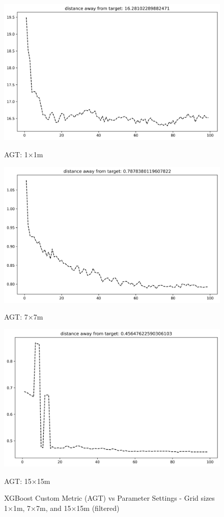 \documentclass[runningheads]{llncs}
\begin{document}
\begin{figure}[H]
	\centering
	\begin{minipage}{0.32\textwidth}
		\centering
		\includegraphics[width=\textwidth]{figures/xgb_softmax_custom_1.png}
		\caption*{AGT: 1×1m}
	\end{minipage}
	\hfill
	\begin{minipage}{0.32\textwidth}
		\centering
		\includegraphics[width=\textwidth]{figures/xgb_softmax_custom_7.png}
		\caption*{AGT: 7×7m}
	\end{minipage}
	\hfill
	\begin{minipage}{0.32\textwidth}
		\centering
		\includegraphics[width=\textwidth]{figures/xgb_softmax_custom_15.png}
		\caption*{AGT: 15×15m}
	\end{minipage}
	\caption{XGBoost Custom Metric (AGT) vs Parameter Settings - Grid sizes 1×1m, 7×7m, and 15×15m (filtered)}
\end{figure}
\end{document}
